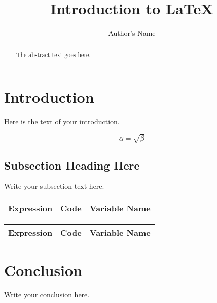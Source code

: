 \documentclass{article}
\begin{document}
\title{Introduction to \LaTeX{}}
\author{Author's Name}

\maketitle

\begin{abstract}
The abstract text goes here.
\end{abstract}

\section{Introduction}
Here is the text of your introduction.

\begin{equation}
    \label{simple_equation}
    \alpha = \sqrt{ \beta }
\end{equation}

\subsection{Subsection Heading Here}
Write your subsection text here.


\begin{table}[ht]
\begin{minipage}[b]{.4\linewidth}\centering
\begin{tabular}{ |c|r|r| } 
 \hline
 Expression & Code & Variable Name \\ 
 \hline
 \hline

 \hline
\end{tabular}
\end{minipage}
\hspace{1.5cm}
\begin{minipage}[b]{.4\linewidth}
\centering
\begin{tabular}{ |c|r|r| } 
 \hline
 Expression & Code & Variable Name \\ 
 \hline
 \hline

 \hline
\end{tabular}
\end{minipage}
\end{table}



\section{Conclusion}
Write your conclusion here.
\end{document}
